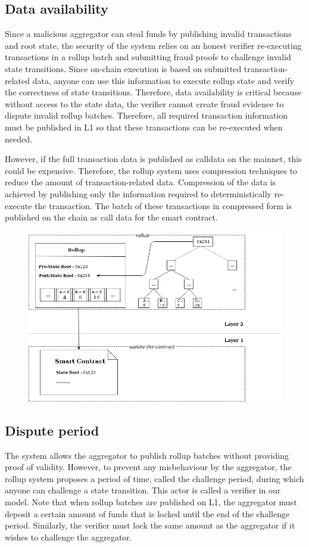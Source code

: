 \documentclass{article}
\begin{document}
\subsection{Data availability}

Since a malicious aggregator can steal funds by publishing invalid transactions and root state, the security of the system relies on an honest verifier re-executing transactions in a rollup batch and submitting fraud proofs to challenge invalid state transitions. Since on-chain execution is based on submitted transaction-related data, anyone can use this information to execute rollup state and verify the correctness of state transitions. Therefore, data availability is critical because without access to the state data, the verifier cannot create fraud evidence to dispute invalid rollup batches. Therefore, all required transaction information must be published in L1 so that these transactions can be re-executed when needed.

However, if the full transaction data is published as calldata on the mainnet, this could be expensive. Therefore, the rollup system uses compression techniques to reduce the amount of transaction-related data. Compression of the data is achieved by publishing only the information required to deterministically re-execute the transaction. The batch of these transactions in compressed form is published on the chain as call data for the smart contract.
\begin{figure}[t]
\includegraphics[width=12cm]{rollup-batch-data}
\centering
\label{rollup-batch-data}
\end{figure}
\subsection{Dispute period}
The system allows the aggregator to publish rollup batches without providing proof of validity. However, to prevent any misbehaviour by the aggregator, the rollup system proposes a period of time, called the challenge period, during which anyone can challenge a state transition. This actor is called a verifier in our model. Note that when rollup batches are published on L1, the aggregator must deposit a certain amount of funds that is locked until the end of the challenge period. Similarly, the verifier must lock the same amount as the aggregator if it wishes to challenge the aggregator.
\end{document}
